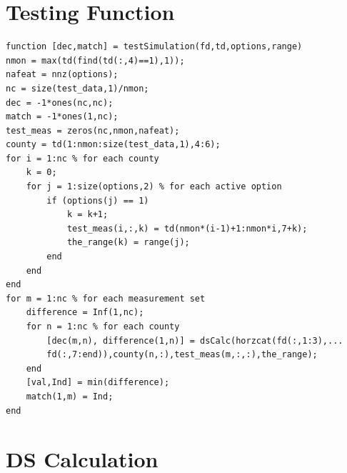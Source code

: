 \documentclass[12pt]{uthesis-v12}  %
\begin{document}
\section{Testing Function}

\begin{verbatim}
function [dec,match] = testSimulation(fd,td,options,range)
nmon = max(td(find(td(:,4)==1),1)); 
nafeat = nnz(options); 
nc = size(test_data,1)/nmon;
dec = -1*ones(nc,nc);
match = -1*ones(1,nc);
test_meas = zeros(nc,nmon,nafeat);
county = td(1:nmon:size(test_data,1),4:6);
for i = 1:nc % for each county
    k = 0;
    for j = 1:size(options,2) % for each active option
        if (options(j) == 1)
            k = k+1;
            test_meas(i,:,k) = td(nmon*(i-1)+1:nmon*i,7+k);
            the_range(k) = range(j);
        end
    end
end
for m = 1:nc % for each measurement set
    difference = Inf(1,nc);
    for n = 1:nc % for each county
        [dec(m,n), difference(1,n)] = dsCalc(horzcat(fd(:,1:3),...
        fd(:,7:end)),county(n,:),test_meas(m,:,:),the_range);
    end
    [val,Ind] = min(difference);
    match(1,m) = Ind;
end
\end{verbatim}

\section{DS Calculation}
\end{document}
